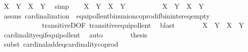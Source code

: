 \begin{isabellebody}
\ {\isachardoublequoteopen}{\isacharbar}{\kern0pt}X{\isacharbar}{\kern0pt}\ {\isasymoplus}\ {\isacharbar}{\kern0pt}Y{\isacharbar}{\kern0pt}\ {\isacharequal}{\kern0pt}\ {\isacharbar}{\kern0pt}{\isacharbar}{\kern0pt}X{\isacharbar}{\kern0pt}\ {\isasymCoprod}\ {\isacharbar}{\kern0pt}Y{\isacharbar}{\kern0pt}{\isacharbar}{\kern0pt}{\isachardoublequoteclose}\ \isamarkupfalse%
\ simp\isanewline
\ \ \isamarkupfalse%
\ {\isachardoublequoteopen}{\isacharbar}{\kern0pt}X\ {\isasymunion}\ Y{\isacharbar}{\kern0pt}\ {\isacharequal}{\kern0pt}\ {\isacharbar}{\kern0pt}X{\isacharbar}{\kern0pt}\ {\isasymoplus}\ {\isacharbar}{\kern0pt}Y{\isacharbar}{\kern0pt}{\isachardoublequoteclose}\isanewline
\ \ \isamarkupfalse%
\ {\isacharminus}{\kern0pt}\isanewline
\ \ \ \ \isamarkupfalse%
\ {\isachardoublequoteopen}X\ {\isasymunion}\ Y\ {\isasymapprox}\ {\isacharbar}{\kern0pt}X{\isacharbar}{\kern0pt}\ {\isasymCoprod}\ {\isacharbar}{\kern0pt}Y{\isacharbar}{\kern0pt}{\isachardoublequoteclose}\ \isanewline
\ \ \ \ \ \ \isamarkupfalse%
\ assms\ cardinalization\ \ equipollent{\isacharunderscore}{\kern0pt}bin{\isacharunderscore}{\kern0pt}union{\isacharunderscore}{\kern0pt}coprod{\isacharunderscore}{\kern0pt}if{\isacharunderscore}{\kern0pt}bin{\isacharunderscore}{\kern0pt}inter{\isacharunderscore}{\kern0pt}eq{\isacharunderscore}{\kern0pt}empty\ \isanewline
\ \ \ \ \ \ \ \ \ \ \ \ transitiveD{\isacharbrackleft}{\kern0pt}OF\ transitive{\isacharunderscore}{\kern0pt}equipollent{\isacharbrackright}{\kern0pt}\ \isamarkupfalse%
\ blast\isanewline
\ \ \ \ \isamarkupfalse%
\ \isamarkupfalse%
\ {\isachardoublequoteopen}{\isacharbar}{\kern0pt}X\ {\isasymunion}\ Y{\isacharbar}{\kern0pt}\ {\isacharequal}{\kern0pt}\ {\isacharbar}{\kern0pt}{\isacharbar}{\kern0pt}X{\isacharbar}{\kern0pt}\ {\isasymCoprod}\ {\isacharbar}{\kern0pt}Y{\isacharbar}{\kern0pt}{\isacharbar}{\kern0pt}{\isachardoublequoteclose}\ \isamarkupfalse%
\ cardinality{\isacharunderscore}{\kern0pt}eq{\isacharunderscore}{\kern0pt}if{\isacharunderscore}{\kern0pt}equipollent\ \isamarkupfalse%
\ auto\isanewline
\ \ \ \ \isamarkupfalse%
\ \isamarkupfalse%
\ {\isacharquery}{\kern0pt}thesis\ \isamarkupfalse%
\ {\isacharparenleft}{\kern0pt}subst\ cardinal{\isacharunderscore}{\kern0pt}add{\isacharunderscore}{\kern0pt}eq{\isacharunderscore}{\kern0pt}cardinality{\isacharunderscore}{\kern0pt}coprod{\isacharparenright}{\kern0pt}\isanewline
\ \ \ \ \ \ \ \ \isamarkupfalse%

\end{isabellebody}
